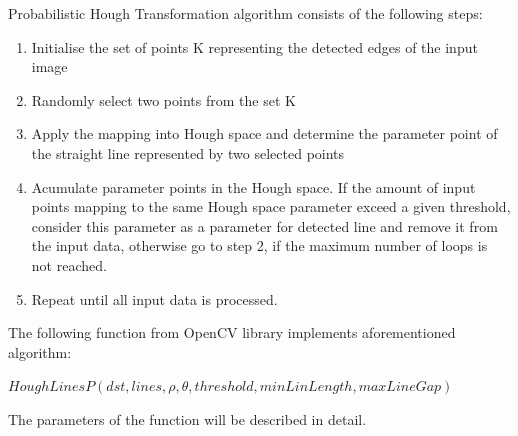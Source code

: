 Probabilistic Hough Transformation algorithm consists of the following steps:

\begin{enumerate}

\item Initialise the set of points K representing the detected edges of the input image
\item  Randomly select two points from the set K  
\item  Apply the mapping into Hough space and determine the parameter point of the straight line represented by two selected points
\item  Acumulate parameter points in the Hough space. If  the amount of input points mapping to the same Hough space parameter exceed a given threshold, consider this parameter as a parameter for detected line and remove it from the input data, otherwise go to step 2, if the maximum number of loops is not reached.
\item  Repeat until all input data is processed.
\end{enumerate}

The following function from OpenCV library implements aforementioned algorithm:

  \begin{center}
  
\texttt{$HoughLinesP(dst, lines, \rho, \theta, threshold, minLinLength, maxLineGap )  $}

  \end{center}

The parameters of the function will be described in detail.\cite{Standard_Hough_Transformation2}
 
